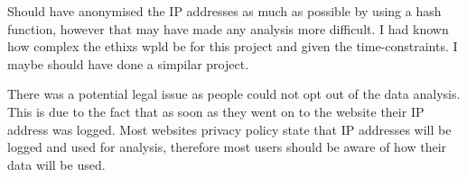 Should have anonymised the IP addresses as much as possible by using a hash function, however that may have made any analysis more difficult. I had known how complex the ethixs wpld be for this project and given the time-constraints. I maybe should have done a simpilar project.

There was a potential legal issue as people could not opt out of the data analysis. This is due to the fact that as soon as they went on to the website their IP address was logged. Most websites privacy policy state that IP addresses will be logged and used for analysis, therefore most users should be aware of how their data will be used.